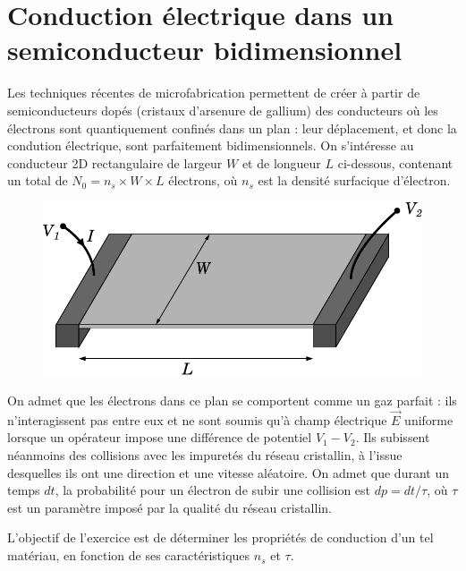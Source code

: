 \documentclass{report}
\begin{document}
\newpage

\section*{Conduction électrique dans un semiconducteur bidimensionnel}
 
Les techniques récentes de microfabrication permettent de créer à partir de semiconducteurs dopés (cristaux d'arsenure de gallium) des conducteurs où les électrons sont quantiquement confinés dans un plan : leur déplacement, et donc la condution électrique, sont parfaitement bidimensionnels. On s'intéresse au conducteur 2D rectangulaire de largeur $W$ et de longueur $L$ ci-dessous, contenant un total de $N_0=n_s\times W\times L$ électrons, où $n_s$ est la densité surfacique d'électron.

\begin{figure}[h!]
\centering
		\includegraphics[scale=0.5]{2DEG_square.pdf}
\end{figure}

On admet que les électrons dans ce plan se comportent comme un gaz parfait : ils n'interagissent pas entre eux et ne sont soumis qu'à champ électrique $\vec{E}$ uniforme lorsque un opérateur impose une différence de potentiel $V_1-V_2$. Ils subissent néanmoins des collisions avec les impuretés du réseau cristallin, à l'issue desquelles ils ont une direction et une vitesse aléatoire. On admet que durant un temps $dt$, la probabilité pour un électron de subir une collision est $dp = dt/\tau$, où $\tau$ est un paramètre imposé par la qualité du réseau cristallin.

L'objectif de l'exercice est de déterminer les propriétés de conduction d'un tel matériau, en fonction de ses caractéristiques $n_s$ et $\tau$.
\end{document}
